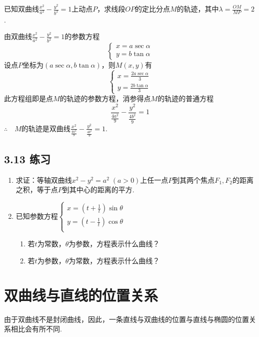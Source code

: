 \begin{example}
    已知双曲线$\frac{x^2}{a^2}-\frac{y^2}{b^2}=1$上动点$P$，求线段$OP$的定比分点$M$的轨迹，其中$\lambda=\frac{OM}{MP}=2$.
\end{example}

\begin{solution}
由双曲线$\frac{x^2}{a^2}-\frac{y^2}{b^2}=1$的参数方程
\[\begin{cases}
    x=a\sec\alpha\\ y=b\tan\alpha
\end{cases}\]
设点$P$坐标为$(a\sec\alpha,b\tan\alpha)$，则$M(x,y)$有
\[\begin{cases}
    x=\frac{2a\sec\alpha}{3} \\[1.5ex]
    y=\frac{2b\tan\alpha}{3} 
\end{cases}\]
此方程组即是点$M$的轨迹的参数方程，消参得点$M$的轨迹的普通方程
\[\frac{x^2}{\frac{4a^2}{9}}-\frac{y^2}{\frac{4b^2}{9}}=1\]
$\therefore\quad M$的轨迹是双曲线$\frac{x^2}{\frac{4a^2}{9}}-\frac{y^2}{\frac{4b^2}{9}}=1$.
\end{solution}

\subsection*{3.13 练习}
\begin{enumerate}
    \item 求证：等轴双曲线$x^2-y^2=a^2\; (a>0)$上任一点$P$到其两个焦点$F_1,F_2$的距离之积，等于点$P$到其中心的距离的平方.
    \item 已知参数方程$\begin{cases}
        x=\left(t+\frac{1}{t}\right)\sin\theta\\[1.5ex]
        y=\left(t-\frac{1}{t}\right)\cos\theta\\
    \end{cases}$
\begin{enumerate}[(1)]
    \item 若$t$为常数，$\theta$为参数，方程表示什么曲线？
    \item 若$t$为参数，$\theta$为常数，方程表示什么曲线？
\end{enumerate}
\end{enumerate}

\section{双曲线与直线的位置关系}
由于双曲线不是封闭曲线，因此，一条直线与双曲线的位置与直线与椭圆的位置关系相比会有所不同. 

